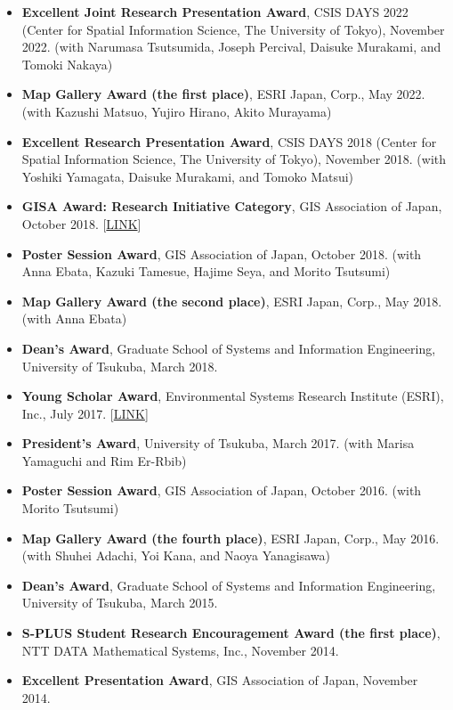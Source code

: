 \documentclass[
]{book}
\providecommand{\tightlist}{%
  \setlength{\itemsep}{0pt}\setlength{\parskip}{0pt}}
\begin{document}
\begin{itemize}
\tightlist
\item
  \textbf{Excellent Joint Research Presentation Award}, CSIS DAYS 2022 (Center for Spatial Information Science, The University of Tokyo), November 2022.
  (with Narumasa Tsutsumida, Joseph Percival, Daisuke Murakami, and Tomoki Nakaya)
\item
  \textbf{Map Gallery Award (the first place)}, ESRI Japan, Corp., May 2022.
  (with Kazushi Matsuo, Yujiro Hirano, Akito Murayama)
\item
  \textbf{Excellent Research Presentation Award}, CSIS DAYS 2018 (Center for Spatial Information Science, The University of Tokyo), November 2018.
  (with Yoshiki Yamagata, Daisuke Murakami, and Tomoko Matsui)
\item
  \textbf{GISA Award: Research Initiative Category}, GIS Association of Japan, October 2018. {[}\href{http://www.gisa-japan.org/file/nl108.pdf}{LINK}{]}
\item
  \textbf{Poster Session Award}, GIS Association of Japan, October 2018.
  (with Anna Ebata, Kazuki Tamesue, Hajime Seya, and Morito Tsutsumi)
\item
  \textbf{Map Gallery Award (the second place)}, ESRI Japan, Corp., May 2018.
  (with Anna Ebata)
\item
  \textbf{Dean's Award}, Graduate School of Systems and Information Engineering, University of Tsukuba, March 2018.
\item
  \textbf{Young Scholar Award}, Environmental Systems Research Institute (ESRI), Inc., July 2017. {[}\href{https://www.esrij.com/cgi-bin/wp/wp-content/uploads/2017/01/YSA-Taiken2017.pdf}{LINK}{]}
\item
  \textbf{President's Award}, University of Tsukuba, March 2017.
  (with Marisa Yamaguchi and Rim Er-Rbib)
\item
  \textbf{Poster Session Award}, GIS Association of Japan, October 2016.
  (with Morito Tsutsumi)
\item
  \textbf{Map Gallery Award (the fourth place)}, ESRI Japan, Corp., May 2016.
  (with Shuhei Adachi, Yoi Kana, and Naoya Yanagisawa)
\item
  \textbf{Dean's Award}, Graduate School of Systems and Information Engineering, University of Tsukuba, March 2015.
\item
  \textbf{S-PLUS Student Research Encouragement Award (the first place)}, NTT DATA Mathematical Systems, Inc., November 2014.
\item
  \textbf{Excellent Presentation Award}, GIS Association of Japan, November 2014.
\end{itemize}
\end{document}

